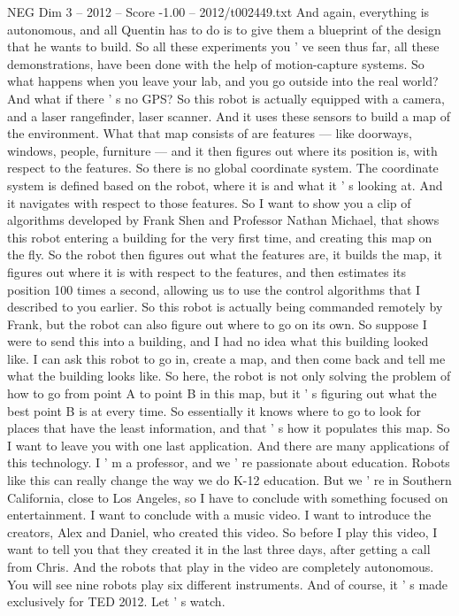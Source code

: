 \begin{textsample}{NEG Dim 3 – 2012 – Score -1.00 – 2012/t002449.txt}
And again, everything is autonomous, and all Quentin has to do is to give them a blueprint of the design that he wants to build.
So all these experiments you ' ve seen thus far, all these demonstrations, have been done with the help of motion-capture systems.
So what happens when you leave your lab, and you go outside into the real world?
And what if there ' s no GPS?
So this robot is actually equipped with a camera, and a laser rangefinder, laser scanner.
And it uses these sensors to build a map of the environment.
What that map consists of are features — like doorways, windows, people, furniture — and it then figures out where its position is, with respect to the features.
So there is no global coordinate system.
The coordinate system is defined based on the robot, where it is and what it ' s looking at.
And it navigates with respect to those features.
So I want to show you a clip of algorithms developed by Frank Shen and Professor Nathan Michael, that shows this robot entering a building for the very first time, and creating this map on the fly.
So the robot then figures out what the features are, it builds the map, it figures out where it is with respect to the features, and then estimates its position 100 times a second, allowing us to use the control algorithms that I described to you earlier.
So this robot is actually being commanded remotely by Frank, but the robot can also figure out where to go on its own.
So suppose I were to send this into a building, and I had no idea what this building looked like.
I can ask this robot to go in, create a map, and then come back and tell me what the building looks like.
So here, the robot is not only solving the problem of how to go from point A to point B in this map, but it ' s figuring out what the best point B is at every time.
So essentially it knows where to go to look for places that have the least information, and that ' s how it populates this map.
So I want to leave you with one last application.
And there are many applications of this technology.
I ' m a professor, and we ' re passionate about education.
Robots like this can really change the way we do K-12 education.
But we ' re in Southern California, close to Los Angeles, so I have to conclude with something focused on entertainment.
I want to conclude with a music video.
I want to introduce the creators, Alex and Daniel, who created this video.
So before I play this video, I want to tell you that they created it in the last three days, after getting a call from Chris.
And the robots that play in the video are completely autonomous.
You will see nine robots play six different instruments.
And of course, it ' s made exclusively for TED 2012.
Let ' s watch.

\end{textsample}
